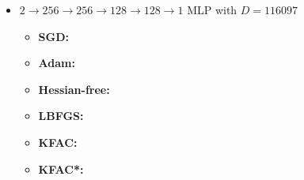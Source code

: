 \begin{itemize}
\item $2 \to 256 \to 256\to 128 \to 128 \to 1$ MLP with $D=\num{116097}$
  \begin{itemize}
    \def\pathToRuns{kfac_pinns_exp/exp20_poisson2d_mlp_tanh_256/tex}
  \item \textbf{SGD:} 
  \item \textbf{Adam:} 
  \item \textbf{Hessian-free:} 
  \item \textbf{LBFGS:} 
  \item \textbf{KFAC:} 
  \item \textbf{KFAC*:} 
  \end{itemize}
\end{itemize}

